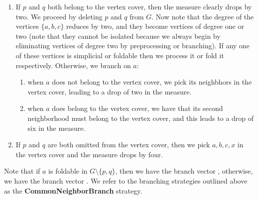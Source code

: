\documentclass[svgnames]{llncs}
\newcommand{\branchvector}[1]{{\color{IndianRed}{$(#1)$}}}
\begin{document}
\begin{enumerate}
\item If $p$ and $q$ both belong to the vertex cover, then the measure clearly drops by two. We proceed by deleting $p$ and $q$ from $G$. Now note that the degree of the vertices $\{a,b,c\}$ reduces by two, 
and they become vertices of degree one or two (note that they cannot be isolated because we always begin by eliminating vertices of degree two by preprocessing or branching). If any one of these vertices is simplicial or
foldable then we process it or fold it respectively. Otherwise, we branch on $a$:
\begin{enumerate}
\item when $a$ does not belong to the vertex cover, we pick its neighbhors in the vertex cover, leading to a drop of two in the measure.
\item when $a$ does belong to the vertex cover, we have that its second neighborhood must belong to the vertex cover, and this leads to a drop of six in the measure.
\end{enumerate}
\item If $p$ and $q$ are both omitted from the vertex cover, then we pick $a,b,c,x$ in the vertex cover and the measure drops by four.


\end{enumerate}

Note that if $a$ is foldable in $G \setminus \{p,q\}$, then we have the branch vector \branchvector{3,4}, otherwise, we have the branch vector \branchvector{4,8,4}.
We refer to the branching strategies outlined above as the {\bf CommonNeighborBranch} strategy.
\end{document}
